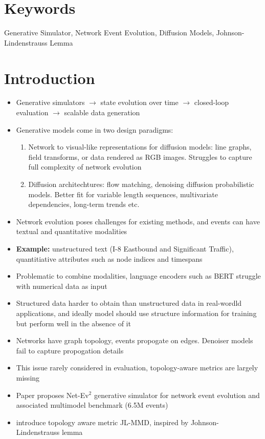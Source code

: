 \documentclass[11pt]{article}
\begin{document}
\section{Keywords}
Generative Simulator, Network Event Evolution, Diffusion Models, Johnson-Lindenstrauss Lemma

\section{Introduction}

\begin{itemize}
  \item Generative simulators $\rightarrow$ state evolution over time $\rightarrow$ closed-loop evaluation $\rightarrow$ scalable data generation
  \item Generative models come in two design paradigms:
    \begin{enumerate}
      \item Network to visual-like representations for diffusion models: line graphs, field transforms, or data rendered as RGB images. Struggles to capture full complexity of network evolution
      \item Diffusion architechtures: flow matching, denoising diffusion probabilistic models. Better fit for variable length sequences, multivariate dependencies, long-term trends etc.
    \end{enumerate}
  \item Network evolution poses challenges for existing methods, and events can have textual and quantitative modalities
  \item \textbf{Example:} unstructured text (I-8 Eastbound and Significant Traffic), quantitiative attributes such as node indices and timespans
  \item Problematic to combine modalities, language encoders such as BERT struggle with numerical data as input
  \item Structured data harder to obtain than unstructured data in real-wordld applications, and ideally model should use structure information for training but perform well in the absence of it
  \item Networks have graph topology, events propogate on edges. Denoiser models fail to capture propogation details
  \item This issue rarely considered in evaluation, topology-aware metrics are largely missing
  \item Paper proposes Net-Ev$^2$ generative simulator for network event evolution and associated multimodel benchmark (6.5M events)
  \item introduce topology aware metric JL-MMD, inspired by Johnson-Lindenstrauss lemma
\end{itemize}
\end{document}
